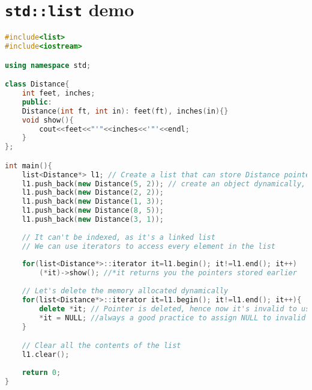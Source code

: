 \documentclass[a4paper,12pt]{article}
\begin{document}
	\section{\texttt{std::list} demo}
	\begin{lstlisting}[frame=single,language=c++]
#include<list>
#include<iostream>

using namespace std;

class Distance{
	int feet, inches;
	public:
	Distance(int ft, int in): feet(ft), inches(in){}
	void show(){
		cout<<feet<<"'"<<inches<<'"'<<endl;
	}
};

int main(){
	list<Distance*> l1; // Create a list that can store Distance pointers
	l1.push_back(new Distance(5, 2)); // create an object dynamically, and store pointer to l1
	l1.push_back(new Distance(2, 2));
	l1.push_back(new Distance(1, 3));
	l1.push_back(new Distance(8, 5));
	l1.push_back(new Distance(3, 1));
	
	// It can't be indexed, as it's a linked list
	// We can use iterators to access every element in the list
	
	for(list<Distance*>::iterator it=l1.begin(); it!=l1.end(); it++)
		(*it)->show(); //*it returns you the pointers stored earlier
	
	// Let's delete the memory allocated dynamically    
	for(list<Distance*>::iterator it=l1.begin(); it!=l1.end(); it++){
		delete *it;	// Pointer is deleted, hence now it's invalid to use.
		*it = NULL; //always a good practice to assign NULL to invalid pointer.
	}

	// Clear all the contents of the list
	l1.clear();
	
	return 0;
}
	\end{lstlisting}
\end{document}
